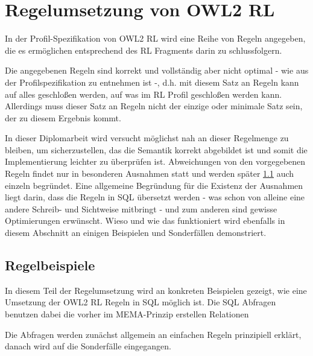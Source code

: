\section{Regelumsetzung von OWL2 RL}
\label{abschnitt-regelumsetzung-owl2-rl}
In der Profil-Spezifikation von OWL2 RL \cite{OWL2Profiles} wird eine Reihe von Regeln angegeben, die es ermöglichen entsprechend des RL Fragments darin zu schlussfolgern.

Die angegebenen Regeln sind korrekt und vollständig aber nicht optimal - wie aus der Profilspezifikation zu entnehmen ist -, d.h. mit diesem Satz an Regeln kann auf alles geschloßen werden, auf was im RL Profil geschloßen werden kann. Allerdings muss dieser Satz an Regeln nicht der einzige oder minimale Satz sein, der zu diesem Ergebnis kommt.

In dieser Diplomarbeit wird versucht möglichst nah an dieser Regelmenge zu bleiben, um sicherzustellen, das die Semantik korrekt abgebildet ist und somit die Implementierung leichter zu überprüfen ist.
Abweichungen von den vorgegebenen Regeln findet nur in besonderen Ausnahmen statt und werden später \ref{abschnitt-regelbeispiele} auch einzeln begründet. Eine allgemeine Begründung für die Existenz der Ausnahmen liegt darin, dass die Regeln in SQL übersetzt werden - was schon von alleine eine andere Schreib- und Sichtweise  mitbringt - und zum anderen sind gewisse Optimierungen erwünscht.
Wieso und wie das funktioniert wird ebenfalls in diesem Abschnitt an einigen Beispielen und Sonderfällen demonstriert.

\subsection{Regelbeispiele}
\label{abschnitt-regelbeispiele}
In diesem Teil der Regelumsetzung wird an konkreten Beispielen gezeigt, wie eine Umsetzung der OWL2 RL Regeln in SQL möglich ist. Die SQL Abfragen benutzen dabei die vorher im MEMA-Prinzip erstellen Relationen

Die Abfragen werden zunächst allgemein an einfachen Regeln prinzipiell erklärt, danach wird auf die Sonderfälle eingegangen.

